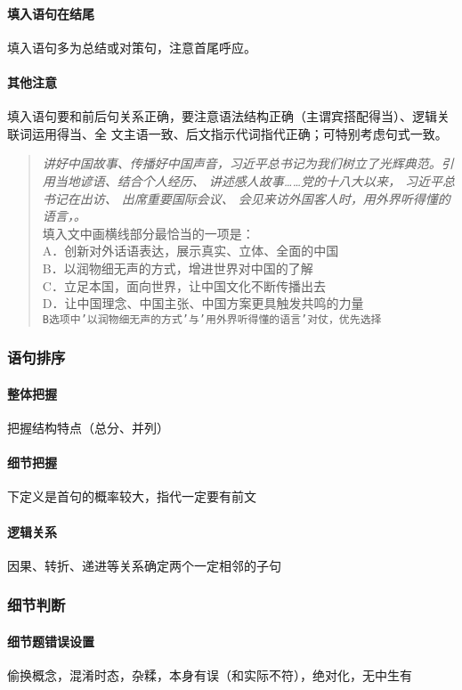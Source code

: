 \paragraph{填入语句在结尾} 填入语句多为总结或对策句，注意首尾呼应。
\paragraph{其他注意} 填入语句要和前后句关系正确，要注意语法结构正确（主谓宾搭配得当）、逻辑关联词运用得当、全
文主语一致、后文指示代词指代正确；可特别考虑句式一致。

\begin{quote}
	\begin{tcolorbox}[colback=blue!5, colframe=blue!75!black, title=考虑句式一致]
		\textit{讲好中国故事、传播好中国声音，习近平总书记为我们树立了光辉典范。引用当地谚语、结合个人经历、 讲述感人故事……党的十八大以来， 习近平总书记在出访、 出席重要国际会议、 会见来访外国客人时，用外界听得懂的语言，\underline{\hspace{2cm}}。}\\
		填入文中画横线部分最恰当的一项是：\\
		A．创新对外话语表达，展示真实、立体、全面的中国\\
		B．以润物细无声的方式，增进世界对中国的了解\\
		C．立足本国，面向世界，让中国文化不断传播出去\\
		D．让中国理念、中国主张、中国方案更具触发共鸣的力量\\
		\tcblower%
		\texttt{B选项中'以润物细无声的方式'与'用外界听得懂的语言'对仗，优先选择}
	\end{tcolorbox}
\end{quote}

\subsubsection{语句排序}

\paragraph{整体把握} 把握结构特点（总分、并列）
\paragraph{细节把握} 下定义是首句的概率较大，指代一定要有前文
\paragraph{逻辑关系} 因果、转折、递进等关系确定两个一定相邻的子句

\subsubsection{细节判断}

\paragraph{细节题错误设置} 偷换概念，混淆时态，杂糅，本身有误（和实际不符），绝对化，无中生有
